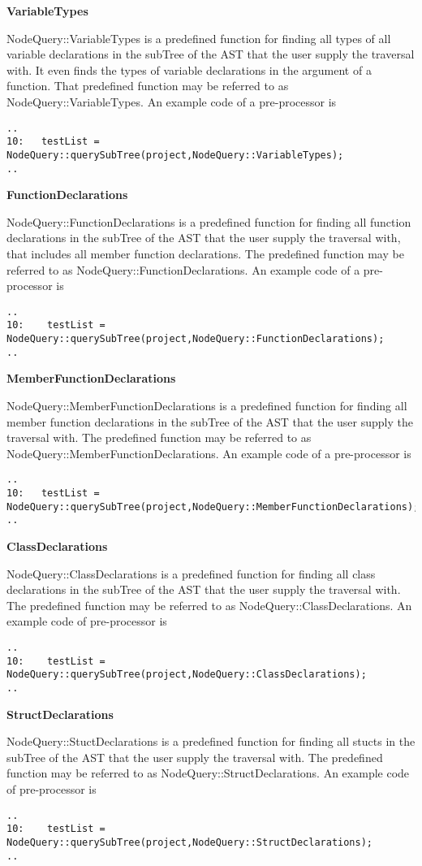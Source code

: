 {\textbf{VariableTypes}

NodeQuery::VariableTypes is a predefined function for finding all
types of all variable declarations in the subTree of the AST that the
user supply the traversal with. It even finds the types of variable
declarations in the argument of a function. That predefined function
may be referred to as NodeQuery::VariableTypes. An example code of a
pre-processor is
\begin{verbatim}
..
10:   testList = NodeQuery::querySubTree(project,NodeQuery::VariableTypes);
..
\end{verbatim}

\textbf{FunctionDeclarations}

NodeQuery::FunctionDeclarations is a predefined function for finding
all function declarations in the subTree of the AST that the user
supply the traversal with, that includes all member function
declarations. The predefined function may be referred to as
NodeQuery::FunctionDeclarations. An example code of a pre-processor is
\begin{verbatim}
..
10:    testList = NodeQuery::querySubTree(project,NodeQuery::FunctionDeclarations);
..
\end{verbatim}

\textbf{MemberFunctionDeclarations}

NodeQuery::MemberFunctionDeclarations is a predefined function for finding
all member function declarations in the subTree of the AST that the user
supply the traversal with. The predefined function may be referred to as
NodeQuery::MemberFunctionDeclarations. An example code of a pre-processor is
\begin{verbatim}
..
10:   testList = NodeQuery::querySubTree(project,NodeQuery::MemberFunctionDeclarations);
..
\end{verbatim}


\textbf{ClassDeclarations}

NodeQuery::ClassDeclarations is a predefined function for finding all
class declarations in the subTree of the AST that the user supply the
traversal with. The predefined function may be referred to as
NodeQuery::ClassDeclarations. An example code of pre-processor is
\begin{verbatim}
..	
10:    testList = NodeQuery::querySubTree(project,NodeQuery::ClassDeclarations);
..
\end{verbatim}


\textbf{StructDeclarations}

NodeQuery::StuctDeclarations is a predefined function for finding all
stucts in the subTree of the AST that the user supply the
traversal with. The predefined function may be referred to as
NodeQuery::StructDeclarations. An example code of pre-processor is
\begin{verbatim}
..
10:    testList = NodeQuery::querySubTree(project,NodeQuery::StructDeclarations);
..
\end{verbatim}

}
